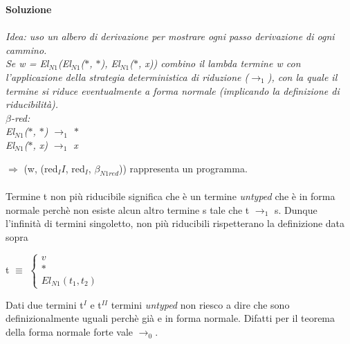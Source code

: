 \textbf{Soluzione}\\\\
\textit{Idea: uso un albero di derivazione per mostrare ogni passo derivazione di ogni cammino.\\
Se w = El$_{N1}$(El$_{N1}$($\ast$, $\ast$), El$_{N1}$($\ast$, x)) combino il lambda termine w  con l'applicazione della strategia deterministica di riduzione ($\rightarrow_1$), con la quale il termine si riduce eventualmente a forma normale (implicando la definizione di riducibilit\`a).\\
$\beta$-red:\\
\textit{El$_{N1}$($\ast$, $\ast$) $\rightarrow_1$ $\ast$}\\
\textit{El$_{N1}$($\ast$, x) $\rightarrow_1$ x}
}

\begin{prooftree}
\end{prooftree}
\noindent
 $\Rightarrow$ (w, (red$_II$, red$_I$, $\beta_{N1red}$)) rappresenta un programma.\\\\
\noindent
Termine t non pi\`u riducibile significa che \`e un termine \textit{untyped} che \`e in forma normale perch\`e non esiste alcun altro termine s tale che t $\rightarrow_1$ s. Dunque l'infinit\`a di termini singoletto, non pi\`u riducibili rispetterano la definizione data sopra\\
\begin{center}
t $\equiv$
$
\begin{cases}
v \\
\ast \\
El_{N1}(t_1, t_2)
\end{cases}
$
\end{center}
\noindent Dati due termini t$^I$ e t$^{II}$ termini \textit{untyped} non riesco a dire che sono definizionalmente uguali perch\`e gi\`a e in forma normale. Difatti  per il teorema della forma normale forte vale $\rightarrow_0$.






















